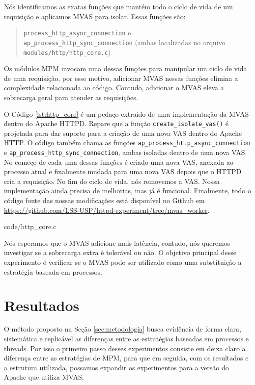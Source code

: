 Nós identificamos as exatas funções que mantém todo o ciclo de vida de um
requisição e aplicamos MVAS para isolar. Essas funções são:

\begin{quote}
  \texttt{process\_http\_async\_connection} e\\
  \texttt{ap\_process\_http\_sync\_connection} (ambas localizadas no arquivo
  \texttt{modules/http/http\_core.c})
\end{quote}

Os módulos MPM invocam uma dessas funções para manipular um ciclo de vida de
uma requisição, por esse motivo, adicionar MVAS nessas funções elimina a
complexidade relacionada ao código. Contudo, adicionar o MVAS eleva a
sobrecarga geral para atender as requisições.

O Código \ref{lst:http_core} é um pedaço extraído de uma implementação da MVAS
dentro do Apache HTTPD. Repare que a função \texttt{create\_isolate\_vas()} é
projetada para dar suporte para a criação de uma nova VAS dentro do Apache
HTTP. O código também chama as funções
\texttt{ap\_process\_http\_async\_connection} e
\texttt{ap\_process\_http\_sync\_connection}, ambas isoladas dentro de uma nova
VAS. No começo de cada uma dessas funções é criado uma nova VAS, anexada ao
processo atual e finalmente mudada para uma nova VAS depois que o HTTPD cria a
requisição. No fim do ciclo de vida, nós removemos a VAS. Nossa implementação
ainda precisa de melhorias, mas já é funcional. Finalmente, todo o código fonte
das nossas modificações está disponível no Github em
\url{https://github.com/LSS-USP/httpd-experiment/tree/mvas\_worker}.

 {code/http_core.c}

Nós esperamos que o MVAS adicione mais latência, contudo, nós queremos
investigar se a sobrecarga extra é tolerável ou não. O objetivo principal desse
experimento é verificar se o MVAS pode ser utilizado como uma substituição a
estratégia baseada em processos.

\section{Resultados}
\label{sec:preliminary}

O método proposto na Seção \ref{sec:metodologia} busca evidência de forma
clara, sistemática e replicável as diferenças entre as estratégias baseadas em
processos e threads. Por isso o primeiro passo desses experimentos consiste em
deixa claro a diferença entre as estratégias de MPM, para que em seguida, com
os resultados e a estrutura utilizada, possamos expandir os experimentos para a
versão do Apache que utiliza MVAS.

